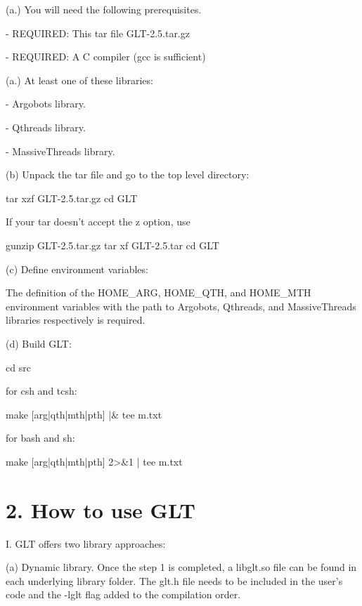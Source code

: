 (a.) You will need the following prerequisites. \begin{DoxyVerb}- REQUIRED: This tar file GLT-2.5.tar.gz

- REQUIRED: A C compiler (gcc is sufficient)
\end{DoxyVerb}


(a.) At least one of these libraries\-: \begin{DoxyVerb}- Argobots library.

- Qthreads library.

- MassiveThreads library.
\end{DoxyVerb}


(b) Unpack the tar file and go to the top level directory\-: \begin{DoxyVerb}  tar xzf GLT-2.5.tar.gz
  cd GLT 
\end{DoxyVerb}


If your tar doesn't accept the z option, use \begin{DoxyVerb}  gunzip GLT-2.5.tar.gz
  tar xf GLT-2.5.tar
  cd GLT
\end{DoxyVerb}


(c) Define environment variables\-: \begin{DoxyVerb}The definition of the HOME_ARG, HOME_QTH, and HOME_MTH environment 
variables with the path to Argobots, Qthreads, and MassiveThreads 
libraries respectively is required.
\end{DoxyVerb}


(d) Build G\-L\-T\-: \begin{DoxyVerb}cd src

for csh and tcsh:

  make [arg|qth|mth|pth] |& tee m.txt

for bash and sh:

  make [arg|qth|mth|pth] 2>&1 | tee m.txt
\end{DoxyVerb}






\section*{2. How to use G\-L\-T }

I. G\-L\-T offers two library approaches\-:

(a) Dynamic library. Once the step 1 is completed, a libglt.\-so file can be found in each underlying library folder. The glt.\-h file needs to be included in the user's code and the -\/lglt flag added to the compilation order.

